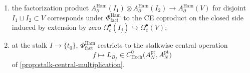 \documentclass[11pt]{memoir}
\begin{document}
\begin{thm}
\begin{enumerate}
      topological direction $\R$ in the sense of Lurie,
      \emph{Higher Algebra}, \S 5.5; Costello--Gwilliam
      \cite{costello-gwilliam}*{Vol.~I \S 6.4} supplies the published
      factorization-algebra terminology.  This does not assert that
      extension by zero
      \(\mathcal D'_c(I')\to\mathcal D'_c(I)\) is a quasi-isomorphism
      for arbitrary compactly supported distributional currents;
    \item the factorization product
      $A_\partial^{\mathrm{Ham}}(I_1)\otimes A_\partial^{\mathrm{Ham}}(I_2)
        \to A_\partial^{\mathrm{Ham}}(V)$ for disjoint
      $I_1\sqcup I_2\subset V$ corresponds under
      $\Phi^{\mathrm{Ham}}_{\mathrm{fact}}$ to the CE coproduct on the
      closed side induced by extension by zero
      $\Omega_c^\bullet(I_j)\hookrightarrow\Omega_c^\bullet(V)$;
    \item at the stalk $I\to\{t_0\}$,
      $\Phi^{\mathrm{Ham}}_{\mathrm{fact}}$ restricts to the stalkwise
      central operation
      $$f\longmapsto L_{B_f}\in
      C^0_{\mathrm{Hoch}}\bigl(A_N^{\mathrm{pt}},
      A_N^{\mathrm{pt}}\bigr)$$
      of \ref{prop:stalk-central-multiplication}.
  \end{enumerate}
\end{thm}
\end{document}
